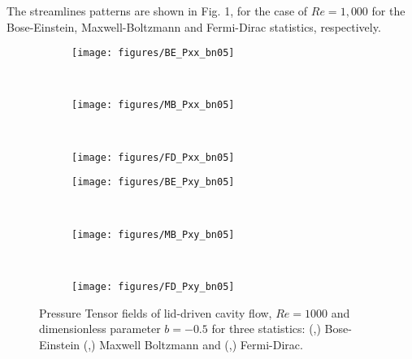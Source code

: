 \documentclass[doublecol]{epl2}
\begin{document}
The streamlines patterns are shown in Fig. 1, for the case of $Re=1,000$ for the Bose-Einstein, Maxwell-Boltzmann and Fermi-Dirac statistics, respectively.
\begin{figure*}[ht]
\centering
        \begin{subfigure}[b]{0.3\textwidth}
                \centering
                \texttt{[image: figures/BE\_Pxx\_bn05]}
                \caption{ }
                \label{fig:BE_Pxx_bn05}
        \end{subfigure}%
				~
				\begin{subfigure}[b]{0.3\textwidth}
                \centering
                \texttt{[image: figures/MB\_Pxx\_bn05]}
                \caption{ }
                \label{fig:MB_Pxx_bn05}
        \end{subfigure}%
				~
				\begin{subfigure}[b]{0.3\textwidth}
                \centering
                \texttt{[image: figures/FD\_Pxx\_bn05]}
                \caption{ }
                \label{fig:FD_Pxx_bn05}
        \end{subfigure}%
				
				\begin{subfigure}[b]{0.3\textwidth}
                \centering
                \texttt{[image: figures/BE\_Pxy\_bn05]}
                \caption{ }
                \label{fig:BE_Pxy_bn05}
        \end{subfigure}%
				~
				\begin{subfigure}[b]{0.3\textwidth}
                \centering
                \texttt{[image: figures/MB\_Pxy\_bn05]}
                \caption{ }
                \label{fig:MB_Pxy_bn05}
        \end{subfigure}%
				~
				\begin{subfigure}[b]{0.3\textwidth}
                \centering
                \texttt{[image: figures/FD\_Pxy\_bn05]}
                \caption{ }
                \label{fig:FD_Pxy_bn05}
        \end{subfigure}%
	\caption{Pressure Tensor fields of lid-driven cavity flow, $Re=1000$ and dimensionless parameter $b=-0.5$ for three statistics:
	(,) Bose-Einstein (,) Maxwell Boltzmann and
 	(,) Fermi-Dirac.}
	\label{fig:Pressure_Tensor_bn05}
\end{figure*}
\end{document}

